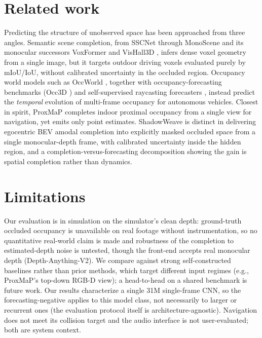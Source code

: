 \documentclass{article}
\begin{document}
\section{Related work}
\label{sec:related}

Predicting the structure of unobserved space has been approached from three angles. Semantic scene
completion, from SSCNet \citep{song2017sscnet} through MonoScene \citep{cao2022monoscene} and its
monocular successors VoxFormer \citep{li2023voxformer} and VisHall3D \citep{lu2025vishall3d},
infers dense voxel geometry from a
single image, but it targets outdoor driving voxels evaluated purely by mIoU/IoU, without
calibrated uncertainty in the occluded region. Occupancy world models such as
OccWorld \citep{zheng2024occworld}, together with occupancy-forecasting
benchmarks (Occ3D \citep{tian2023occ3d}) and self-supervised raycasting forecasters
\citep{khurana2023pointcloud}, instead predict the \emph{temporal} evolution of multi-frame occupancy for autonomous vehicles.
Closest in spirit, ProxMaP \citep{sharma2023proxmap} completes indoor proximal occupancy from a single
view for navigation, yet emits only point estimates. ShadowWeave is distinct in delivering
egocentric BEV amodal completion into explicitly masked occluded space from a single
monocular-depth frame, with calibrated uncertainty inside the hidden region, and a
completion-versus-forecasting decomposition showing the gain is spatial completion rather than
dynamics.

\section{Limitations}
\label{sec:limitations}

Our evaluation is in simulation on the simulator's clean depth: ground-truth occluded occupancy is
unavailable on real footage without instrumentation, so no quantitative real-world claim is made
and robustness of the completion to estimated-depth noise is untested, though the front-end accepts
real monocular depth (Depth-Anything-V2). We compare against strong self-constructed baselines
rather than prior methods, which target different input regimes (e.g., ProxMaP's top-down RGB-D
view); a head-to-head on a shared benchmark is future work. Our results characterize a single 31M
single-frame CNN, so the forecasting-negative applies to this model class, not necessarily to
larger or recurrent ones (the evaluation protocol itself is architecture-agnostic). Navigation
does not meet its collision target and the audio interface is not user-evaluated; both are system
context.
\end{document}

